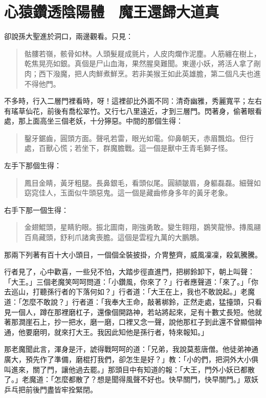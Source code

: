 
\chapter{心猿鑽透陰陽體　魔王還歸大道真}

卻說孫大聖進於洞口，兩邊觀看。只見：
\begin{quote}
骷髏若嶺，骸骨如林。人頭髮屣成氈片，人皮肉爛作泥塵。人筋纏在樹上，乾焦晃亮如銀。真個是尸山血海，果然腥臭難聞。東邊小妖，將活人拿了剮肉；西下潑魔，把人肉鮮煮鮮烹。若非美猴王如此英雄膽，第二個凡夫也進不得他門。
\end{quote}

不多時，行入二層門裡看時，呀！這裡卻比外面不同：清奇幽雅，秀麗寬平；左右有瑤草仙花，前後有喬松翠竹。又行七八里遠近，才到三層門。閃著身，偷著眼看處，那上面高坐三個老妖，十分獰惡。中間的那個生得：
\begin{quote}
鑿牙鋸齒，圓頭方面。聲吼若雷，眼光如電。仰鼻朝天，赤眉飄焰。但行處，百獸心慌；若坐下，群魔膽戰。這一個是獸中王青毛獅子怪。
\end{quote}

左手下那個生得：
\begin{quote}
鳳目金睛，黃牙粗腿。長鼻銀毛，看頭似尾。圓額皺眉，身軀磊磊。細聲如窈窕佳人，玉面似牛頭惡鬼。這一個是藏齒修身多年的黃牙老象。
\end{quote}

右手下那一個生得：
\begin{quote}
金翅鯤頭，星睛豹眼。振北圖南，剛強勇敢。變生翱翔，鷃笑龍慘。摶風翮百鳥藏頭，舒利爪諸禽喪膽。這個是雲程九萬的大鵬鵰。
\end{quote}

那兩下列著有百十大小頭目，一個個全裝披掛，介冑整齊，威風凜凜，殺氣騰騰。

行者見了，心中歡喜，一些兒不怕，大踏步徑直進門，把梆鈴卸下，朝上叫聲：「大王。」三個老魔笑呵呵問道：「小鑽風，你來了？」行者應聲道：「來了。」「你去巡山，打聽孫行者的下落何如？」行者道：「大王在上，我也不敢說起。」老魔道：「怎麼不敢說？」行者道：「我奉大王命，敲著梆鈴，正然走處，猛擡頭，只看見一個人，蹲在那裡磨杠子，還像個開路神，若站將起來，足有十數丈長短。他就著那澗崖石上，抄一把水，磨一磨，口裡又念一聲，說他那杠子到此還不曾顯個神通，他要磨明，就來打大王。我因此知他是孫行者，特來報知。」

那老魔聞此言，渾身是汗，諕得戰呵呵的道：「兄弟，我說莫惹唐僧。他徒弟神通廣大，預先作了準備，磨棍打我們，卻怎生是好？」教：「小的們，把洞外大小俱叫進來，關了門，讓他過去罷。」那頭目中有知道的報：「大王，門外小妖已都散了。」老魔道：「怎麼都散了？想是聞得風聲不好也。快早關門，快早關門。」眾妖乒乓把前後門盡皆牢拴緊閉。

